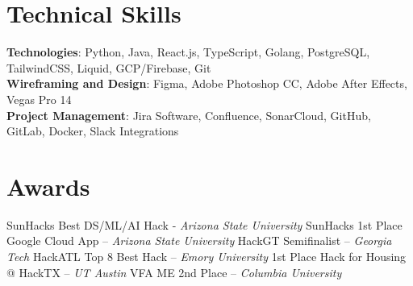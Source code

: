 \documentclass[letterpaper,11pt]{article}
\begin{document}
%
\section{Technical Skills}
 \begin{itemize}[leftmargin=0.15in, label={}]
    \small{\item{
     \textbf{Technologies}{: Python, Java, React.js, TypeScript, Golang, PostgreSQL, TailwindCSS, Liquid, GCP/Firebase, Git} \\
     \textbf{Wireframing and Design}{: Figma, Adobe Photoshop CC, Adobe After Effects, Vegas Pro 14} \\
     \textbf{Project Management}{: Jira Software, Confluence, SonarCloud, GitHub, GitLab, Docker, Slack Integrations} \\
    }}
 \end{itemize}
 \vspace{-16pt}


\section{Awards}
            \linespread{-0.5pt}
            \small
                \textbullet \- SunHacks Best DS/ML/AI Hack - \textit{Arizona State University} \textbullet \- SunHacks 1st Place Google Cloud App -- \textit{Arizona State University} \textbullet  \- HackGT Semifinalist -- \textit{Georgia Tech} \textbullet \- HackATL Top 8 Best Hack -- \textit{Emory University} \textbullet \- 1st Place Hack for Housing @ HackTX -- \textit{UT Austin} \textbullet \- VFA ME 2nd Place -- \textit{Columbia University}
\end{document}
